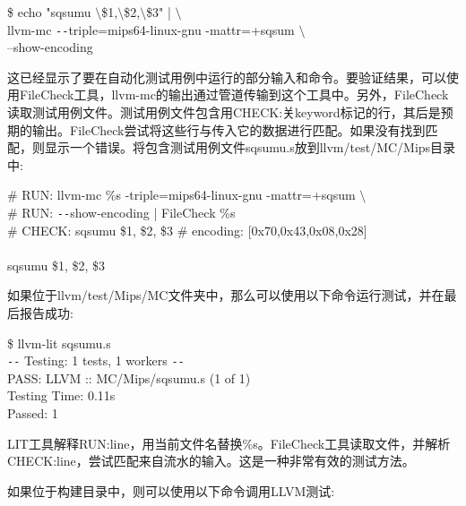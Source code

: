 \begin{tcolorbox}[colback=white,colframe=black]
\$ echo "sqsumu $\setminus$\$1,$\setminus$\$2,$\setminus$\$3" | $\setminus$ \\
\hspace*{0.5cm}llvm-mc \verb|--|triple=mips64-linux-gnu -mattr=+sqsum $\setminus$ \\
\hspace*{2.5cm}--show-encoding
\end{tcolorbox}

这已经显示了要在自动化测试用例中运行的部分输入和命令。要验证结果，可以使用FileCheck工具，llvm-mc的输出通过管道传输到这个工具中。另外，FileCheck读取测试用例文件。测试用例文件包含用CHECK:关keyword标记的行，其后是预期的输出。FileCheck尝试将这些行与传入它的数据进行匹配。如果没有找到匹配，则显示一个错误。将包含测试用例文件sqsumu.s放到llvm/test/MC/Mips目录中:\par

\begin{tcolorbox}[colback=white,colframe=black]
\# RUN: llvm-mc \%s -triple=mips64-linux-gnu -mattr=+sqsum $\setminus$ \\
\# RUN: \verb|--|show-encoding | FileCheck \%s \\
\# CHECK: sqsumu \$1, \$2, \$3 \# encoding: [0x70,0x43,0x08,0x28] \\
\\
\hspace*{1cm}sqsumu \$1, \$2, \$3
\end{tcolorbox}

如果位于llvm/test/Mips/MC文件夹中，那么可以使用以下命令运行测试，并在最后报告成功:\par

\begin{tcolorbox}[colback=white,colframe=black]
\$ llvm-lit sqsumu.s \\
\verb|--| Testing: 1 tests, 1 workers \verb|--| \\
PASS: LLVM :: MC/Mips/sqsumu.s (1 of 1) \\
Testing Time: 0.11s \\
\hspace*{0.5cm}Passed: 1
\end{tcolorbox}

LIT工具解释RUN:line，用当前文件名替换\%s。FileCheck工具读取文件，并解析CHECK:line，尝试匹配来自流水的输入。这是一种非常有效的测试方法。\par

如果位于构建目录中，则可以使用以下命令调用LLVM测试:\par


